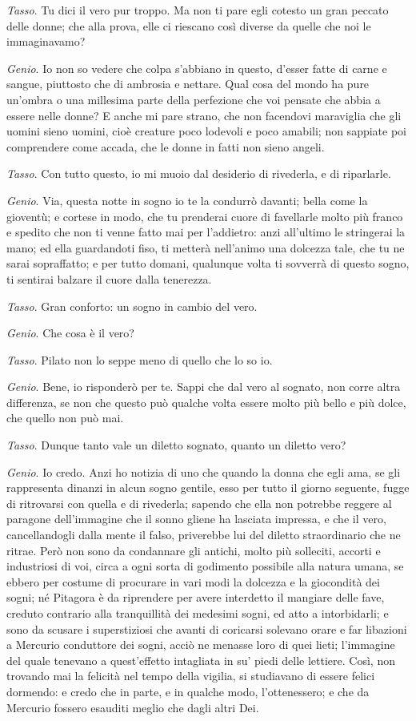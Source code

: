 \emph{Tasso}. Tu dici il vero pur troppo. Ma non ti pare egli cotesto un gran peccato delle donne; che alla prova, elle ci riescano così diverse da quelle che noi le immaginavamo?

\emph{Genio}. Io non so vedere che colpa s'abbiano in questo, d'esser fatte di carne e sangue, piuttosto che di ambrosia e nettare. Qual cosa del mondo ha pure un'ombra o una millesima parte della perfezione che voi pensate che abbia a essere nelle donne? E anche mi pare strano, che non facendovi maraviglia che gli uomini sieno uomini, cioè creature poco lodevoli e poco amabili; non sappiate poi comprendere come accada, che le donne in fatti non sieno angeli.

\emph{Tasso}. Con tutto questo, io mi muoio dal desiderio di rivederla, e di riparlarle.

\emph{Genio}. Via, questa notte in sogno io te la condurrò davanti; bella come la gioventù; e cortese in modo, che tu prenderai cuore di favellarle molto più franco e spedito che non ti venne fatto mai per l'addietro: anzi all'ultimo le stringerai la mano; ed ella guardandoti fiso, ti metterà nell'animo una dolcezza tale, che tu ne sarai sopraffatto; e per tutto domani, qualunque volta ti sovverrà di questo sogno, ti sentirai balzare il cuore dalla tenerezza.

\emph{Tasso}. Gran conforto: un sogno in cambio del vero.

\emph{Genio}. Che cosa è il vero?

\emph{Tasso}. Pilato non lo seppe meno di quello che lo so io.

\emph{Genio}. Bene, io risponderò per te. Sappi che dal vero al sognato, non corre altra differenza, se non che questo può qualche volta essere molto più bello e più dolce, che quello non può mai.

\emph{Tasso}. Dunque tanto vale un diletto sognato, quanto un diletto vero?

\emph{Genio}. Io credo. Anzi ho notizia di uno che quando la donna che egli ama, se gli rappresenta dinanzi in alcun sogno gentile, esso per tutto il giorno seguente, fugge di ritrovarsi con quella e di rivederla; sapendo che ella non potrebbe reggere al paragone dell'immagine che il sonno gliene ha lasciata impressa, e che il vero, cancellandogli dalla mente il falso, priverebbe lui del diletto straordinario che ne ritrae. Però non sono da condannare gli antichi, molto più solleciti, accorti e industriosi di voi, circa a ogni sorta di godimento possibile alla natura umana, se ebbero per costume di procurare in vari modi la dolcezza e la giocondità dei sogni; né Pitagora è da riprendere per avere interdetto il mangiare delle fave, creduto contrario alla tranquillità dei medesimi sogni, ed atto a intorbidarli; e sono da scusare i superstiziosi che avanti di coricarsi solevano orare e far libazioni a Mercurio conduttore dei sogni, acciò ne menasse loro di quei lieti; l'immagine del quale tenevano a quest'effetto intagliata in su' piedi delle lettiere. Così, non trovando mai la felicità nel tempo della vigilia, si studiavano di essere felici dormendo: e credo che in parte, e in qualche modo, l'ottenessero; e che da Mercurio fossero esauditi meglio che dagli altri Dei.

